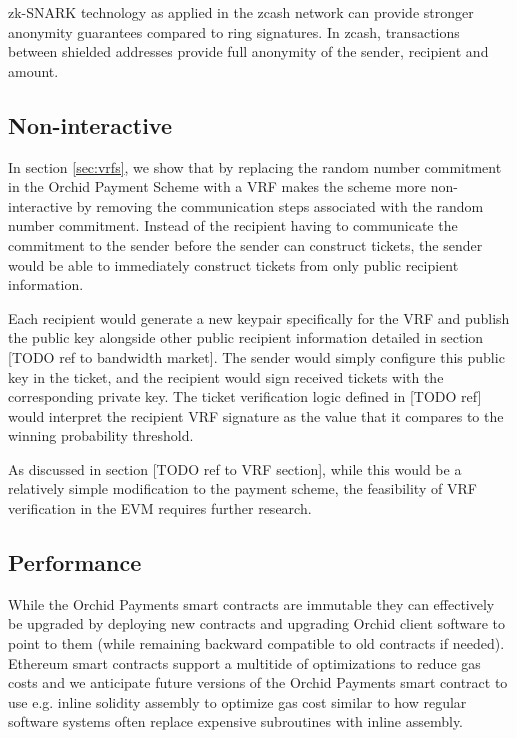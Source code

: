 zk-SNARK\cite{zkSNARKs} technology as applied in the zcash network \cite{zcash-zksnarks} can provide stronger anonymity guarantees compared to ring signatures. In zcash, transactions between shielded addresses provide full anonymity of the sender, recipient and amount.


\subsection{Non-interactive}

In section \ref{sec:vrfs}, we show that by replacing the random number commitment in the Orchid Payment Scheme with a VRF makes the scheme more non-interactive by removing the communication steps associated with the random number commitment. Instead of the recipient having to communicate the commitment to the sender before the sender can construct tickets, the sender would be able to immediately construct tickets from only public recipient information.

Each recipient would generate a new keypair specifically for the VRF and publish the public key alongside other public recipient information detailed in section [TODO ref to bandwidth market]. The sender would simply configure this public key in the ticket, and the recipient would sign received tickets with the corresponding private key. The ticket verification logic defined in [TODO ref] would interpret the recipient VRF signature as the value that it compares to the winning probability threshold.

As discussed in section [TODO ref to VRF section], while this would be a relatively simple modification to the payment scheme, the feasibility of VRF verification in the EVM requires further research.

\subsection{Performance}

While the Orchid Payments smart contracts are immutable they can effectively be upgraded by deploying new contracts and upgrading Orchid client software to point to them (while remaining backward compatible to old contracts if needed). Ethereum smart contracts support a multitide of optimizations to reduce gas costs and we anticipate future versions of the Orchid Payments smart contract to use e.g. inline solidity assembly \cite{SolidityAssembly} to optimize gas cost similar to how regular software systems often replace expensive subroutines with inline assembly.

